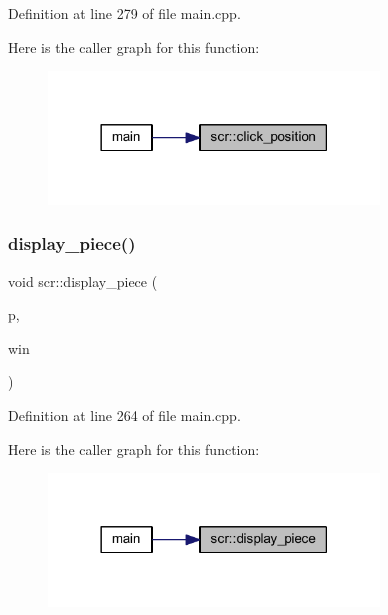 Definition at line 279 of file main.\+cpp.

Here is the caller graph for this function\+:
\nopagebreak
\begin{figure}[H]
\begin{center}
\leavevmode
\includegraphics[width=249pt]{namespacescr_a6cf89150981812b9b3ed4144462f12d6_icgraph}
\end{center}
\end{figure}
\mbox{\label{namespacescr_ab6ad379b890e9ea5edf6211b4ea1e160}} 
\subsubsection{\texorpdfstring{display\_piece()}{display\_piece()}}
{\footnotesize\ttfamily void scr\+::display\+\_\+piece (\begin{DoxyParamCaption}\item[{\mbox{\hyperlink{class_piece}{Piece}} $\ast$}]{p,  }\item[{sf\+::\+Render\+Window \&}]{win }\end{DoxyParamCaption})}



Definition at line 264 of file main.\+cpp.

Here is the caller graph for this function\+:
\nopagebreak
\begin{figure}[H]
\begin{center}
\leavevmode
\includegraphics[width=249pt]{namespacescr_ab6ad379b890e9ea5edf6211b4ea1e160_icgraph}
\end{center}
\end{figure}
\mbox{\label{namespacescr_afbf344f09162239b14701105f01e1671}} 
